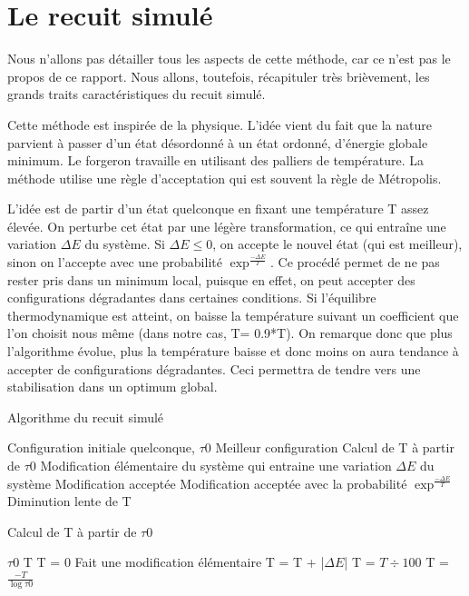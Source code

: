 \documentclass{report}
\begin{document}
\section{Le recuit simulé}
Nous n’allons pas détailler tous les aspects de cette méthode, car ce n’est pas le
propos de ce rapport. Nous allons, toutefois, récapituler très brièvement, les grands
traits caractéristiques du recuit simulé.

Cette méthode est inspirée de la physique. L’idée vient du fait que la nature parvient à passer d’un état désordonné à un état ordonné, d’énergie globale minimum.
Le forgeron travaille en utilisant des palliers de température. La méthode utilise une
règle d’acceptation qui est souvent la règle de Métropolis.

L'idée est de partir d'un état quelconque en fixant une température T assez élevée. On perturbe cet état par une légère transformation, ce qui entraîne une variation $\Delta{E}$ du système. Si $\Delta{E} \leq 0$, on accepte le nouvel état (qui est meilleur), sinon on l'accepte avec une probabilité $\exp^{\frac{-\Delta E}{T}}$. Ce procédé permet de ne pas rester pris dans un minimum local, puisque en effet, on peut accepter des configurations dégradantes dans certaines conditions. Si l'équilibre thermodynamique est atteint, on baisse la température suivant un coefficient que l'on choisit nous même (dans notre cas, T= 0.9*T). On remarque donc que plus l'algorithme évolue, plus la température baisse et donc moins on aura tendance à accepter de configurations dégradantes. Ceci permettra de tendre vers une stabilisation dans un optimum global.
\begin{algorithm}
\caption{Algorithme du recuit simulé}
\begin{algorithmic}
\REQUIRE Configuration initiale quelconque, $\tau 0$
\ENSURE Meilleur configuration
\STATE Calcul de T à partir de $\tau 0$
\STATE Modification élémentaire du système qui entraine une variation $\Delta E$ du système
\STATE Modification acceptée
\ELSE
\STATE Modification acceptée avec la probabilité $\exp^{\frac{-\Delta E}{T}}$
\ENDIF
{}
\STATE Diminution lente de T
\ENDIF
\ENDWHILE
\end{algorithmic}

\end{algorithm}
\begin{algorithm}
\caption{Calcul de T à partir de $\tau 0$}
\begin{algorithmic}
\REQUIRE $\tau 0$
\ENSURE T
\STATE T = 0
\STATE Fait une modification élémentaire
\STATE T = T + |$\Delta E$|
\ENDWHILE
\STATE T = $T \div 100$
\STATE T = $\frac{-T}{\log \tau 0}$
\end{algorithmic}
\end{algorithm}
\end{document}
